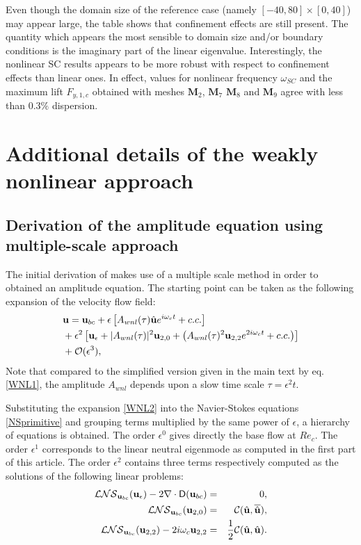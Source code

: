 \documentclass[twocolumn,10pt]{asme2ej}
\newcommand{\be}[1]{ \begin{equation} \label{#1}}
\newcommand{\ee}{\end{equation}}
\begin{document}
Even though the domain size of the reference case (namely $[-40,80]\times[0,40]$) may appear large, the table shows that confinement effects are still present. The quantity which appears the most sensible to domain size and/or boundary conditions is the imaginary part of the linear eigenvalue. Interestingly, the nonlinear SC results appears to be more robust with respect to confinement effects than linear ones. 
In effect, values for nonlinear frequency $\omega_{SC}$ and the maximum lift $F_{y,1,c}$ obtained with meshes  $\mathbf{M}_2$, $\mathbf{M}_7$ $\mathbf{M}_8$ and $\mathbf{M}_9$ agree with less than $0.3\%$ dispersion.





\section{Additional details of the weakly nonlinear approach}

\subsection{Derivation of the amplitude equation using multiple-scale approach}

The initial derivation of \cite{SippLebedev} makes use of a multiple scale method in order to obtained an amplitude equation.
The starting point can be taken as the following expansion of the velocity flow field:
\be{WNL2}
\begin{aligned}
&{\bf u} = {}  {\bf u}_{bc} + \epsilon \left[ A_{wnl}(\tau)  \hat{\bf u} e^{i \omega_c t} + c.c. \right]\\
&+ \epsilon^2 \left[ {\bf u}_\epsilon + |A_{wnl}(\tau) |^2  {\bf u}_{2,0} + \left(  A_{wnl}(\tau) ^2 {\bf u}_{2,2} e^{2 i \omega_c t} + c.c. \right) \right]\\
& + {\cal O}( \epsilon ^3),
\end{aligned}
\ee
Note that compared to the simplified version given in the main text by eq. \ref{WNL1}, the amplitude $A_{wnl}$ depends upon a slow time scale 
$\tau = \epsilon^2 t$.

Substituting the expansion \ref{WNL2} into the Navier-Stokes equations \ref{NSprimitive} and grouping terms multiplied by the same power of $\epsilon$, a hierarchy of equations is obtained. The order $\epsilon^0$ gives directly the base flow at $Re_c$. The order $\epsilon^1$
corresponds to the linear neutral eigenmode as computed in the first part of this article.
The order $\epsilon^2$ contains three terms respectively computed as the solutions of the following linear problems:
\begin{eqnarray}
 {\cal LNS}_{{\bf u}_{bc}} ({\bf u}_\epsilon) - 2 \nabla \cdot {\mathsf D}({\bf u}_{bc}) &=&0,
\label{eq:LL1} \\
{\cal LNS}_{{\bf u}_{bc}} ({\bf u}_{2,0}) &=& {\cal C}(\hat{\bf u},\overline{\hat{\bf u}}), \label{eq:LL2} \\
{\cal LNS}_{{\bf u}_{bc}} ({\bf u}_{2,2}) - 2 i \omega_c {\bf u}_{2,2}  &=& \frac{1}{2} {\cal C}(\hat{\bf u},\hat{\bf u}). \label{eq:LL3}
 \end{eqnarray}
\end{document}

